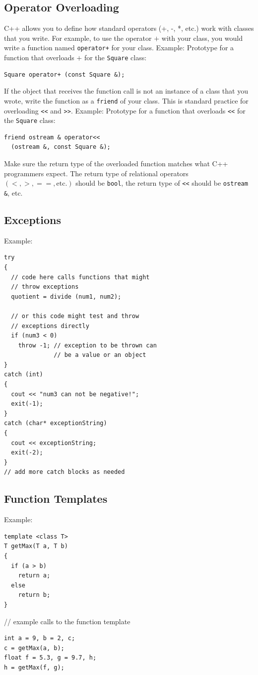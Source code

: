 \documentclass{article}
\begin{document}
\subsection*{Operator Overloading}
C++ allows you to define how standard operators (+, -, *, etc.) work with classes that you write. For example, to use the operator $+$ with your class, you would write a function named \texttt{operator+} for your class.
Example:
Prototype for a function that overloads $+$ for the \texttt{Square} class:
\begin{verbatim}
Square operator+ (const Square &);
\end{verbatim}
If the object that receives the function call is not an instance of a class that you wrote, write the function as a \texttt{friend} of your class. This is standard practice for overloading \texttt{<<} and \texttt{>>}.
Example:
Prototype for a function that overloads \texttt{<<} for the \texttt{Square} class:
\begin{verbatim}
friend ostream & operator<<
  (ostream &, const Square &);
\end{verbatim}
Make sure the return type of the overloaded function matches what C++ programmers expect. The return type of relational operators $(<, >, ==, \text{etc.})$ should be \texttt{bool}, the return type of \texttt{<<} should be \texttt{ostream \&}, etc.

\subsection*{Exceptions}
Example:
\begin{verbatim}
try
{
  // code here calls functions that might
  // throw exceptions
  quotient = divide (num1, num2);

  // or this code might test and throw
  // exceptions directly
  if (num3 < 0)
    throw -1; // exception to be thrown can
              // be a value or an object
}
catch (int)
{
  cout << "num3 can not be negative!";
  exit(-1);
}
catch (char* exceptionString)
{
  cout << exceptionString;
  exit(-2);
}
// add more catch blocks as needed
\end{verbatim}

\subsection*{Function Templates}
Example:
\begin{verbatim}
template <class T>
T getMax(T a, T b)
{
  if (a > b)
    return a;
  else
    return b;
}
\end{verbatim}
// example calls to the function template
\begin{verbatim}
int a = 9, b = 2, c;
c = getMax(a, b);
float f = 5.3, g = 9.7, h;
h = getMax(f, g);
\end{verbatim}
\end{document}
